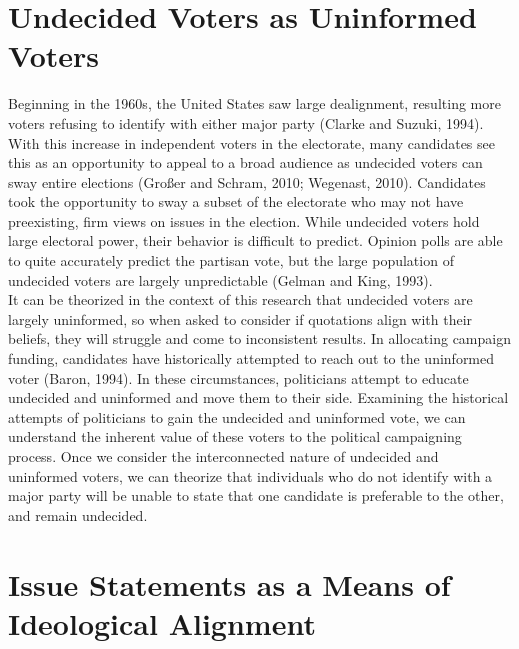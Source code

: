 \documentclass[12pt]{article}
\begin{document}
\section*{Undecided Voters as Uninformed Voters}

Beginning in the 1960s, the United States saw large dealignment, resulting more voters refusing to identify with either major party (Clarke and Suzuki, 1994). With this increase in independent voters in the electorate, many candidates see this as an opportunity to appeal to a broad audience as undecided voters can sway entire elections (Großer and Schram, 2010; Wegenast, 2010). Candidates took the opportunity to sway a subset of the electorate who may not have preexisting, firm views on issues in the election. While undecided voters hold large electoral power, their behavior is difficult to predict. Opinion polls are able to quite accurately predict the partisan vote, but the large population of undecided voters are largely unpredictable (Gelman and King, 1993). \\

It can be theorized in the context of this research that undecided voters are largely uninformed, so when asked to consider if quotations align with their beliefs, they will struggle and come to inconsistent results. In allocating campaign funding, candidates have historically attempted to reach out to the uninformed voter (Baron, 1994). In these circumstances, politicians attempt to educate undecided and uninformed and move them to their side. Examining the historical attempts of politicians to gain the undecided and uninformed vote, we can understand the inherent value of these voters to the political campaigning process. Once we consider the interconnected nature of undecided and uninformed voters, we can theorize that individuals who do not identify with a major party will be unable to state that one candidate is preferable to the other, and remain undecided.\\


\section*{Issue Statements as a Means of Ideological Alignment}
\end{document}
